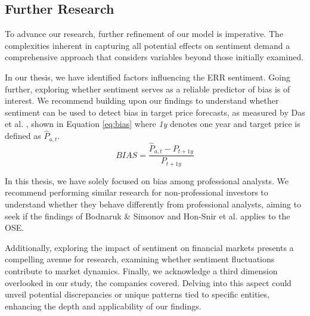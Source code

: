 
\subsection{Further Research}



To advance our research, further refinement of our model is imperative. The complexities inherent in capturing all potential effects on sentiment demand a comprehensive approach that considers variables beyond those initially examined. 

In our thesis, we have identified factors influencing the ERR sentiment. Going further, exploring whether sentiment serves as a reliable predictor of bias is of interest. We recommend building upon our findings to understand whether sentiment can be used to detect bias in target price forecasts, as measured by Das et al. \parencite*{das1998earnings}, shown in Equation \ref{eq:bias} where \textit{1y} denotes one year and target price is defined as \(\hat{P}_{a,t}\).
\begin{equation}\label{eq:bias}
    BIAS=\frac{\hat{P}_{a,t}-P_{t+1y}}{P_{t+1y}}
\end{equation}

In this thesis, we have solely focused on bias among professional analysts. We recommend performing similar research for non-professional investors to understand whether they behave differently from professional analysts, aiming to seek if the findings of Bodnaruk \& Simonov \parencite*{bodnaruk2015financial} and Hon-Snir et al. \parencite*{hon2012stock} applies to the OSE. 

Additionally, exploring the impact of sentiment on financial markets presents a compelling avenue for research, examining whether sentiment fluctuations contribute to market dynamics. Finally, we acknowledge a third dimension overlooked in our study, the companies covered. Delving into this aspect could unveil potential discrepancies or unique patterns tied to specific entities, enhancing the depth and applicability of our findings.



